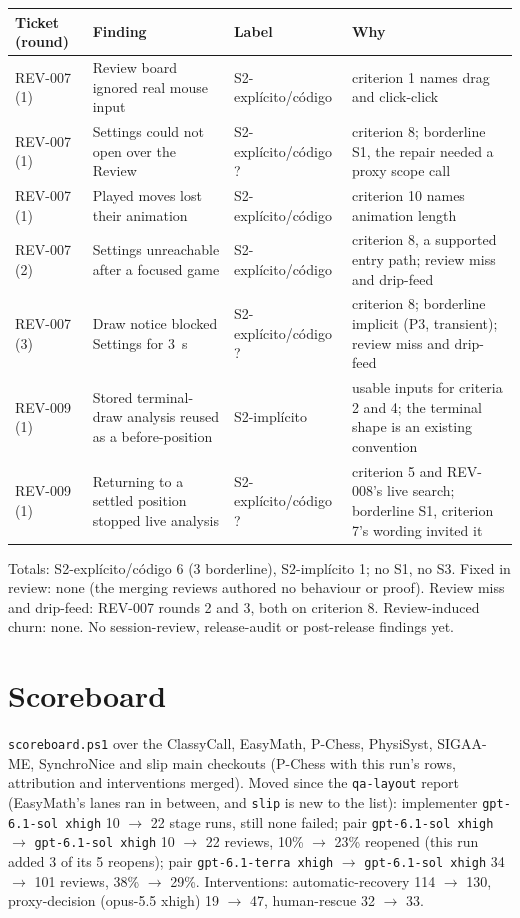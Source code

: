 \documentclass[11pt,a4paper]{article}
\begin{document}
{\small\noindent
\begin{tabularx}{\linewidth}{@{}>{\raggedright\arraybackslash}p{1.7cm}X>{\raggedright\arraybackslash}p{2.7cm}X@{}}
\toprule
Ticket (round) & Finding & Label & Why \\
\midrule
REV-007 (1) & Review board ignored real mouse input & S2-explícito/\allowbreak código & criterion 1 names drag and click-click \\
REV-007 (1) & Settings could not open over the Review & S2-explícito/\allowbreak código ? & criterion 8; borderline S1, the repair needed a proxy scope call \\
REV-007 (1) & Played moves lost their animation & S2-explícito/\allowbreak código & criterion 10 names animation length \\
REV-007 (2) & Settings unreachable after a focused game & S2-explícito/\allowbreak código & criterion 8, a supported entry path; review miss and drip-feed \\
REV-007 (3) & Draw notice blocked Settings for 3~s & S2-explícito/\allowbreak código ? & criterion 8; borderline implicit (P3, transient); review miss and drip-feed \\
REV-009 (1) & Stored terminal-draw analysis reused as a before-position & S2-implícito & usable inputs for criteria 2 and 4; the terminal shape is an existing convention \\
REV-009 (1) & Returning to a settled position stopped live analysis & S2-explícito/\allowbreak código ? & criterion 5 and REV-008's live search; borderline S1, criterion 7's wording invited it \\
\bottomrule
\end{tabularx}
}

Totals: S2-explícito/código 6 (3 borderline), S2-implícito 1; no
S1, no S3. Fixed in review: none (the merging reviews authored no behaviour or proof). Review miss
and drip-feed: REV-007 rounds 2 and 3, both on criterion 8. Review-induced churn: none.
No session-review, release-audit or post-release findings yet.

\section*{Scoreboard}

\texttt{scoreboard.ps1} over the ClassyCall, EasyMath, P-Chess, PhysiSyst, SIGAA-ME, SynchroNice and
slip main checkouts (P-Chess with this run's rows, attribution and interventions merged). Moved
since the \texttt{qa-layout} report (EasyMath's lanes ran in between, and \texttt{slip} is new to
the list): implementer \texttt{gpt-6.1-sol xhigh} 10 $\to$ 22 stage runs, still none failed; pair
\texttt{gpt-6.1-sol xhigh} $\rightarrow$ \texttt{gpt-6.1-sol xhigh} 10 $\to$ 22 reviews, 10\%
$\to$ 23\% reopened (this run added 3 of its 5 reopens); pair \texttt{gpt-6.1-terra xhigh}
$\rightarrow$ \texttt{gpt-6.1-sol xhigh} 34 $\to$ 101 reviews, 38\% $\to$ 29\%. Interventions:
automatic-recovery 114 $\to$ 130, proxy-decision (opus-5.5 xhigh) 19 $\to$ 47, human-rescue 32
$\to$ 33.
\end{document}
